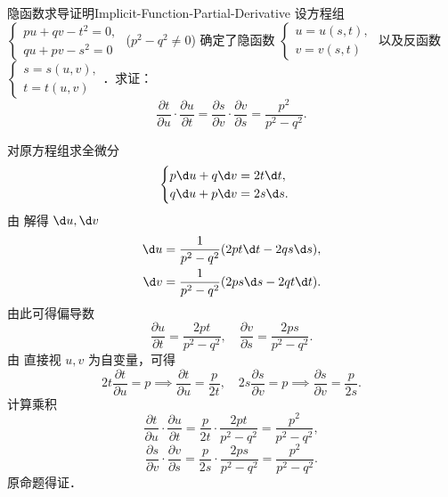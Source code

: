\begin{problem}{隐函数求导证明}{Implicit-Function-Partial-Derivative}
    设方程组 $\begin{cases} pu + qv - t^2 = 0, \\ qu + pv - s^2 = 0 \end{cases}$ ($p^2 - q^2 \neq 0$) 确定了隐函数 $\begin{cases} u = u(s, t), \\ v = v(s, t) \end{cases}$ 以及反函数 $\begin{cases} s = s(u, v), \\ t = t(u, v) \end{cases}$．求证：
    \begin{equation}
        \frac{\partial t}{\partial u} \cdot \frac{\partial u}{\partial t} = \frac{\partial s}{\partial v} \cdot \frac{\partial v}{\partial s} = \frac{p^2}{p^2 - q^2}.
    \end{equation}
\end{problem}

\begin{myproof}
    对原方程组求全微分
    \begin{equation}
        \label{eq:diff-system}
        \begin{cases}
            p \d u + q \d v = 2t \d t, \\
            q \d u + p \d v = 2s \d s.
        \end{cases}
    \end{equation}
    由  解得 $\d u, \d v$
    \begin{equation}
        \begin{aligned}
            \d u & = \frac{1}{p^2 - q^2} (2pt \d t - 2qs \d s), \\
            \d v & = \frac{1}{p^2 - q^2} (2ps \d s - 2qt \d t).
        \end{aligned}
    \end{equation}
    由此可得偏导数
    \begin{equation}
        \frac{\partial u}{\partial t} = \frac{2pt}{p^2 - q^2}, \quad \frac{\partial v}{\partial s} = \frac{2ps}{p^2 - q^2}.
    \end{equation}
    由  直接视 $u, v$ 为自变量，可得
    \begin{equation}
        2t \frac{\partial t}{\partial u} = p \implies \frac{\partial t}{\partial u} = \frac{p}{2t}, \quad 2s \frac{\partial s}{\partial v} = p \implies \frac{\partial s}{\partial v} = \frac{p}{2s}.
    \end{equation}
    计算乘积
    \begin{equation}
        \frac{\partial t}{\partial u} \cdot \frac{\partial u}{\partial t} = \frac{p}{2t} \cdot \frac{2pt}{p^2 - q^2} = \frac{p^2}{p^2 - q^2},
    \end{equation}
    \begin{equation}
        \frac{\partial s}{\partial v} \cdot \frac{\partial v}{\partial s} = \frac{p}{2s} \cdot \frac{2ps}{p^2 - q^2} = \frac{p^2}{p^2 - q^2}.
    \end{equation}
    原命题得证．
\end{myproof}

\endinput
